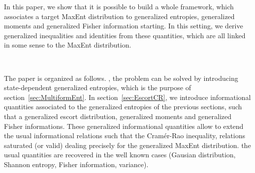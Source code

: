 \documentclass[english,sort&compress]{elsarticle}
\theoremstyle{definition}
\theoremstyle{plain}
\theoremstyle{plain}
\begin{document}
In this paper, we show that it is possible to build a whole framework, which associates a target MaxEnt distribution to generalized  entropies,  generalized   moments  and
generalized Fisher information starting. In this setting, we derive generalized inequalities and  identities from these  quantities, which are all linked in some sense to the MaxEnt distribution. 


\

The paper is organized  as follows. 
, the problem can be  solved by introducing
state-dependent    generalized   entropies,    which   is    the    purpose   of
section~\ref{sec:MultiformEnt}.   In  section~\ref{sec:EscortCR},  we  introduce
informational quantities associated to the generalized entropies of the previous
sections, such  that a generalized escort distribution,  generalized moments and
generalized  Fisher informations.   These  generalized informational  quantities
allow to  extend the  usual informational relations  such that  the Cram\'er-Rao
inequality, relations saturated (or valid) dealing precisely for the generalized
MaxEnt distribution.    the usual
quantities are recovered in the well known cases
(Gausian distribution,  Shannon entropy,  Fisher information, variance).
\end{document}
